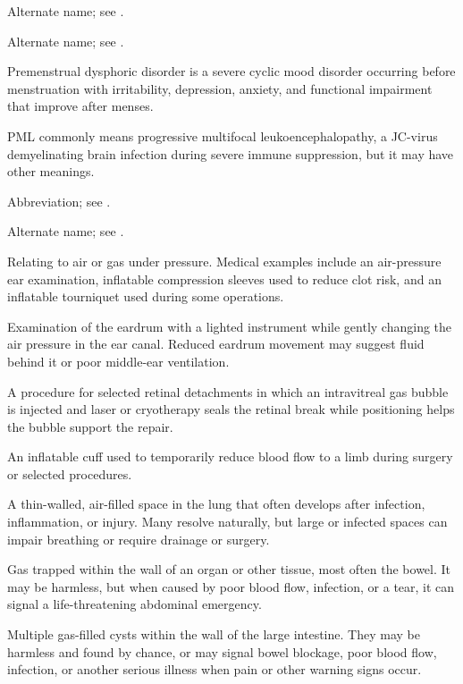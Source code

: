 Alternate name; see .

 Alternate name; see .

 Premenstrual dysphoric disorder is a severe cyclic mood disorder occurring before menstruation with irritability, depression, anxiety, and functional impairment that improve after menses.

 PML commonly means progressive multifocal leukoencephalopathy, a JC-virus demyelinating brain infection during severe immune suppression, but it may have other meanings.

 Abbreviation; see .

 Alternate name; see .

 Relating to air or gas under pressure. Medical examples include an air-pressure ear examination, inflatable compression sleeves used to reduce clot risk, and an inflatable tourniquet used during some operations.

 Examination of the eardrum with a lighted instrument while gently changing the air pressure in the ear canal. Reduced eardrum movement may suggest fluid behind it or poor middle-ear ventilation.

 A procedure for selected retinal detachments in which an intravitreal gas bubble is injected and laser or cryotherapy seals the retinal break while positioning helps the bubble support the repair.

 An inflatable cuff used to temporarily reduce blood flow to a limb during surgery or selected procedures.

 A thin-walled, air-filled space in the lung that often develops after infection, inflammation, or injury. Many resolve naturally, but large or infected spaces can impair breathing or require drainage or surgery.

 Gas trapped within the wall of an organ or other tissue, most often the bowel. It may be harmless, but when caused by poor blood flow, infection, or a tear, it can signal a life-threatening abdominal emergency.

 Multiple gas-filled cysts within the wall of the large intestine. They may be harmless and found by chance, or may signal bowel blockage, poor blood flow, infection, or another serious illness when pain or other warning signs occur.

